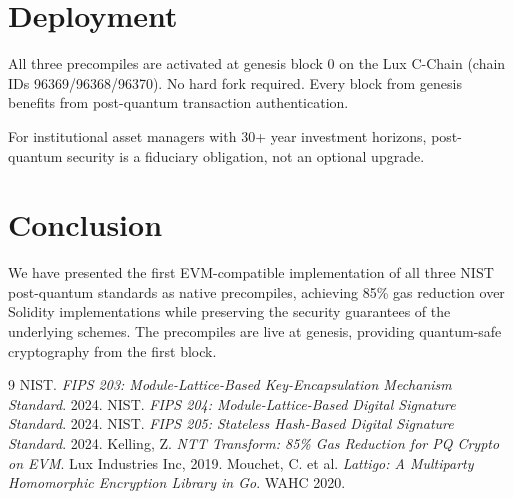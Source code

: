 \documentclass[11pt,letterpaper]{article}
\begin{document}
\section{Deployment}

All three precompiles are activated at genesis block 0 on the Lux C-Chain (chain IDs 96369/96368/96370). No hard fork required. Every block from genesis benefits from post-quantum transaction authentication.

For institutional asset managers with 30+ year investment horizons, post-quantum security is a fiduciary obligation, not an optional upgrade.

\section{Conclusion}

We have presented the first EVM-compatible implementation of all three NIST post-quantum standards as native precompiles, achieving 85\% gas reduction over Solidity implementations while preserving the security guarantees of the underlying schemes. The precompiles are live at genesis, providing quantum-safe cryptography from the first block.


\begin{thebibliography}{9}
 NIST. \textit{FIPS 203: Module-Lattice-Based Key-Encapsulation Mechanism Standard}. 2024.
 NIST. \textit{FIPS 204: Module-Lattice-Based Digital Signature Standard}. 2024.
 NIST. \textit{FIPS 205: Stateless Hash-Based Digital Signature Standard}. 2024.
 Kelling, Z. \textit{NTT Transform: 85\% Gas Reduction for PQ Crypto on EVM}. Lux Industries Inc, 2019.
 Mouchet, C. et al. \textit{Lattigo: A Multiparty Homomorphic Encryption Library in Go}. WAHC 2020.
\end{thebibliography}
\end{document}
